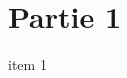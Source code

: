 \documentclass[11pt]{article}
\begin{document}
\section{Partie 1}

\begin{definition}
  \lipsum[1]
  \begin{enu}
  \item item 1
  \end{enu}
\end{definition}

\begin{propriete}
  \lipsum[1]  
\end{propriete}
\end{document}
